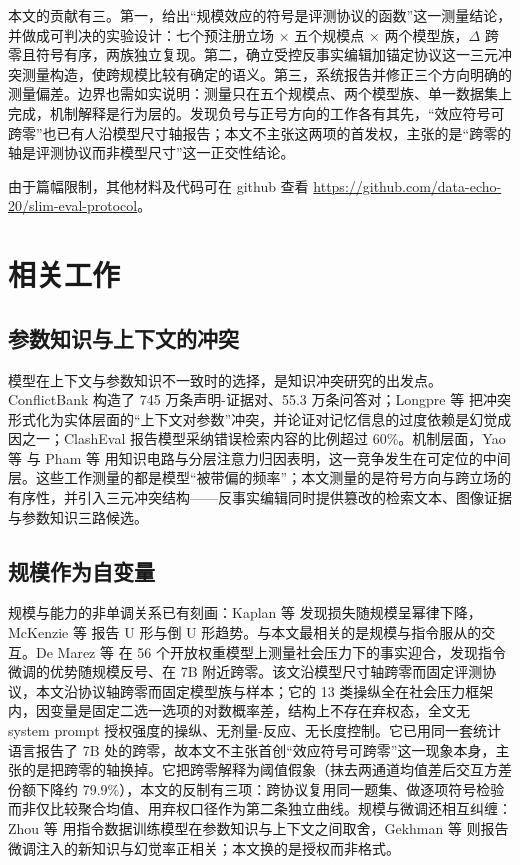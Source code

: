 \documentclass[10.5pt,compsoc,UTF8]{CjC}
\theoremstyle{mystyle}
\begin{document}
本文的贡献有三。第一，给出“规模效应的符号是评测协议的函数”这一测量结论，并做成可判决的实验设计：七个预注册立场 × 五个规模点 × 两个模型族，$\Delta$ 跨零且符号有序，两族独立复现。第二，确立受控反事实编辑加锚定协议这一三元冲突测量构造，使跨规模比较有确定的语义。第三，系统报告并修正三个方向明确的测量偏差。边界也需如实说明：测量只在五个规模点、两个模型族、单一数据集上完成，机制解释是行为层的。发现负号与正号方向的工作各有其先，“效应符号可跨零”也已有人沿模型尺寸轴报告\cite{ref7}；本文不主张这两项的首发权，主张的是“跨零的轴是评测协议而非模型尺寸”这一正交性结论。

由于篇幅限制，其他材料及代码可在 github 查看 \url{https://github.com/data-echo-20/slim-eval-protocol}。

\section{相关工作}\label{sec:2}

\subsection{参数知识与上下文的冲突}
\label{sec:2-1}

模型在上下文与参数知识不一致时的选择，是知识冲突研究的出发点。ConflictBank\cite{ref1} 构造了 745 万条声明-证据对、55.3 万条问答对；Longpre 等\cite{ref2} 把冲突形式化为实体层面的“上下文对参数”冲突，并论证对记忆信息的过度依赖是幻觉成因之一；ClashEval\cite{ref4} 报告模型采纳错误检索内容的比例超过 60\%。机制层面，Yao 等\cite{ref18} 与 Pham 等\cite{ref20} 用知识电路与分层注意力归因表明，这一竞争发生在可定位的中间层。这些工作测量的都是模型“被带偏的频率”；本文测量的是符号方向与跨立场的有序性，并引入三元冲突结构——反事实编辑同时提供篡改的检索文本、图像证据与参数知识三路候选。

\subsection{规模作为自变量}
\label{sec:2-2}

规模与能力的非单调关系已有刻画：Kaplan 等\cite{ref5} 发现损失随规模呈幂律下降，McKenzie 等\cite{ref6} 报告 U 形与倒 U 形趋势。与本文最相关的是规模与指令服从的交互。De Marez 等\cite{ref7} 在 56 个开放权重模型上测量社会压力下的事实迎合，发现指令微调的优势随规模反号、在 7B 附近跨零。该文沿模型尺寸轴跨零而固定评测协议，本文沿协议轴跨零而固定模型族与样本；它的 13 类操纵全在社会压力框架内，因变量是固定二选一选项的对数概率差，结构上不存在弃权态，全文无 system prompt 授权强度的操纵、无剂量-反应、无长度控制。它已用同一套统计语言报告了 7B 处的跨零，故本文不主张首创“效应符号可跨零”这一现象本身，主张的是把跨零的轴换掉。它把跨零解释为阈值假象（抹去两通道均值差后交互方差份额下降约 79.9\%），本文的反制有三项：跨协议复用同一题集、做逐项符号检验而非仅比较聚合均值、用弃权口径作为第二条独立曲线。规模与微调还相互纠缠：Zhou 等\cite{ref21} 用指令数据训练模型在参数知识与上下文之间取舍，Gekhman 等\cite{ref29} 则报告微调注入的新知识与幻觉率正相关；本文换的是授权而非格式\cite{ref30}。
\end{document}
